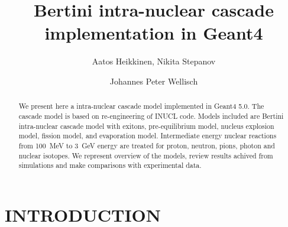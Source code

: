 \documentclass[twocolumn,twoside,slac]{revtex4}
\begin{document}
\title{Bertini intra-nuclear cascade implementation in Geant4}

\author{Aatos Heikkinen, Nikita Stepanov} 


\author{Johannes Peter Wellisch}
\begin{abstract}

We present here a intra-nuclear cascade model implemented in Geant4 5.0. 
The cascade model is based on re-engineering of INUCL code.
Models included are Bertini intra-nuclear cascade model with exitons, pre-equilibrium model, nucleus explosion model, 
fission model, and evaporation model.
Intermediate energy nuclear reactions from 100~MeV to 3~GeV energy are treated for proton, neutron, pions, photon and nuclear isotopes.
We represent overview of the models, review results achived from simulations and make comparisons with experimental data.

\end{abstract}

\maketitle

\thispagestyle{fancy}



\section{INTRODUCTION}
\end{document}
